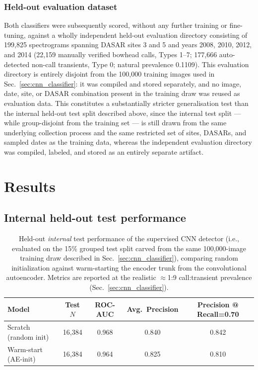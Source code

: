 \documentclass[preprint,NumberedRefs]{JASAnew}
\begin{document}
\subsubsection{Held-out evaluation dataset}
Both classifiers were subsequently scored, without any further training or
fine-tuning, against a wholly independent held-out evaluation directory
consisting of 199,825 spectrograms spanning DASAR sites 3 and 5 and years
2008, 2010, 2012, and 2014 (22,159 manually verified bowhead calls, Types
1--7; 177,666 auto-detected non-call transients, Type 0; natural prevalence
0.1109). This evaluation directory is entirely disjoint from the 100,000
training images used in Sec.~\ref{sec:cnn_classifier}: it was compiled and
stored separately, and no image, date, site, or DASAR combination present
in the training draw was reused as evaluation data. This constitutes a
substantially stricter generalisation test than the internal held-out test
split described above, since the internal test split — while
group-disjoint from the training set — is still drawn from the same
underlying collection process and the same restricted set of sites,
DASARs, and sampled dates as the training data, whereas the independent
evaluation directory was compiled, labeled, and stored as an entirely
separate artifact.


\section{\label{sec:Results} Results}

\subsection{Internal held-out test performance}

\begin{table}[ht]
    \centering
    \caption{Held-out \emph{internal} test performance of the supervised CNN detector
    (i.e., evaluated on the 15\% grouped test split carved from the same
    100,000-image training draw described in Sec.~\ref{sec:cnn_classifier}),
    comparing random initialization against warm-starting the encoder trunk from the
    convolutional autoencoder. Metrics are reported at the realistic
    $\approx$1:9 call:transient prevalence (Sec.~\ref{sec:cnn_classifier}).}
    \label{tab:cnn_results}
    \begin{tabular}{|l|c|c|c|c|}
        \hline
        Model & Test $N$ & ROC-AUC & Avg.\ Precision & Precision @ Recall=0.70 \\
        \hline
        Scratch (random init)     & 16{,}384 & 0.968 & 0.840 & 0.842 \\
        Warm-start (AE-init)      & 16{,}384 & 0.964 & 0.825 & 0.810 \\
        \hline
    \end{tabular}
\end{table}
\end{document}
